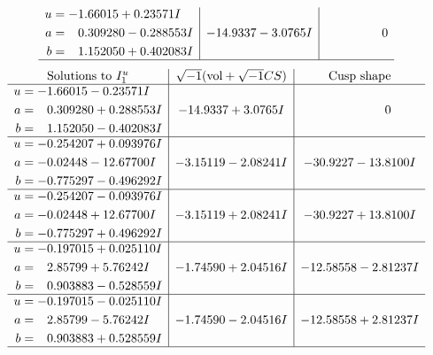 \documentclass[1p]{elsarticle_modified}
\theoremstyle{definition}
\newcommand{\I}{\sqrt{-1}}
\begin{document}
$$\begin{array}{c|c|c}
\begin{aligned}
u &= -1.66015 + 0.23571 I \\
a &= \phantom{-}0.309280 - 0.288553 I \\
b &= \phantom{-}1.152050 + 0.402083 I\end{aligned}
 & -14.9337 - 3.0765 I & \phantom{-0.000000 } 0\\
 \hline 
 \end{array}$$\newpage$$\begin{array}{c|c|c}  
\text{Solutions to }I^u_{1}& \I (\text{vol} + \sqrt{-1}CS) & \text{Cusp shape}\\
 \hline 
\begin{aligned}
u &= -1.66015 - 0.23571 I \\
a &= \phantom{-}0.309280 + 0.288553 I \\
b &= \phantom{-}1.152050 - 0.402083 I\end{aligned}
 & -14.9337 + 3.0765 I & \phantom{-0.000000 } 0 \\ \hline\begin{aligned}
u &= -0.254207 + 0.093976 I \\
a &= -0.02448 - 12.67700 I \\
b &= -0.775297 - 0.496292 I\end{aligned}
 & -3.15119 - 2.08241 I & -30.9227 - 13.8100 I \\ \hline\begin{aligned}
u &= -0.254207 - 0.093976 I \\
a &= -0.02448 + 12.67700 I \\
b &= -0.775297 + 0.496292 I\end{aligned}
 & -3.15119 + 2.08241 I & -30.9227 + 13.8100 I \\ \hline\begin{aligned}
u &= -0.197015 + 0.025110 I \\
a &= \phantom{-}2.85799 + 5.76242 I \\
b &= \phantom{-}0.903883 - 0.528559 I\end{aligned}
 & -1.74590 + 2.04516 I & -12.58558 - 2.81237 I \\ \hline\begin{aligned}
u &= -0.197015 - 0.025110 I \\
a &= \phantom{-}2.85799 - 5.76242 I \\
b &= \phantom{-}0.903883 + 0.528559 I\end{aligned}
 & -1.74590 - 2.04516 I & -12.58558 + 2.81237 I\\
 \hline 
 \end{array}$$\newpage\newpage\renewcommand{\arraystretch}{1}
\end{document}
